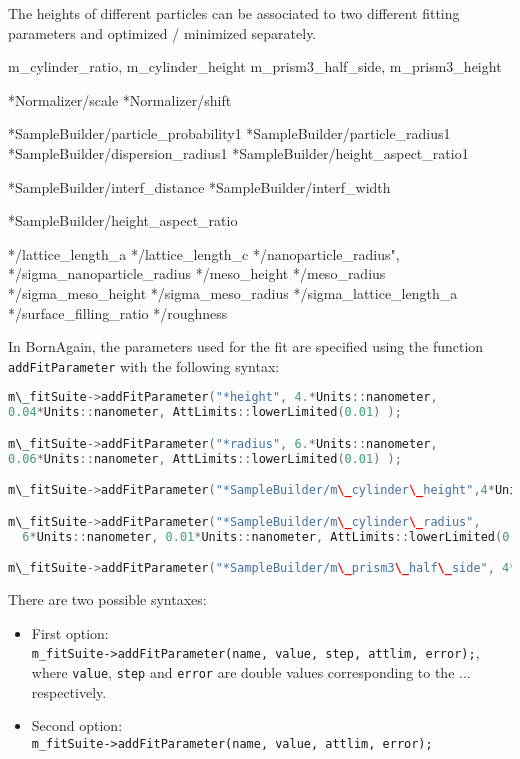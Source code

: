 The heights of different particles can be associated to two different
fitting parameters and optimized / minimized separately.


m\_cylinder\_ratio, m\_cylinder\_height
m\_prism3\_half\_side, m\_prism3\_height
                          
  *Normalizer/scale
  *Normalizer/shift

  *SampleBuilder/particle\_probability1
  *SampleBuilder/particle\_radius1
  *SampleBuilder/dispersion\_radius1
  *SampleBuilder/height\_aspect\_ratio1

  *SampleBuilder/interf\_distance
  *SampleBuilder/interf\_width

 *SampleBuilder/height\_aspect\_ratio
 
   */lattice\_length\_a 
   */lattice\_length\_c   
   */nanoparticle\_radius",     
   */sigma\_nanoparticle\_radius
   */meso\_height       
   */meso\_radius  
   */sigma\_meso\_height
   */sigma\_meso\_radius
   */sigma\_lattice\_length\_a
   */surface\_filling\_ratio
   */roughness

 
In BornAgain, the parameters used for the fit are specified using the
function \texttt{addFitParameter} with the following syntax:

\begin{lstlisting}[language=C++, style=eclipse,numbers=none]
m\_fitSuite->addFitParameter("*height", 4.*Units::nanometer,
0.04*Units::nanometer, AttLimits::lowerLimited(0.01) );

m\_fitSuite->addFitParameter("*radius", 6.*Units::nanometer,
0.06*Units::nanometer, AttLimits::lowerLimited(0.01) );

m\_fitSuite->addFitParameter("*SampleBuilder/m\_cylinder\_height",4*Units::nanometer, 0.01*Units::nanometer,AttLimits::lowerLimited(0.01) );

m\_fitSuite->addFitParameter("*SampleBuilder/m\_cylinder\_radius",
  6*Units::nanometer, 0.01*Units::nanometer, AttLimits::lowerLimited(0.01) );

m\_fitSuite->addFitParameter("*SampleBuilder/m\_prism3\_half\_side", 4*Units::nanometer, 0.01*Units::nanometer,  AttLimits::lowerLimited(0.01) );
\end{lstlisting}

There are two possible syntaxes:
\begin{itemize}
\item First option: \\ \texttt{m\_fitSuite->addFitParameter(name, value, step, attlim, error);},
where \texttt{value}, \texttt{step} and \texttt{error} are double values corresponding to the ... respectively.
\item Second option: \\
\texttt{m\_fitSuite->addFitParameter(name, value, attlim, error);}
\end{itemize}

